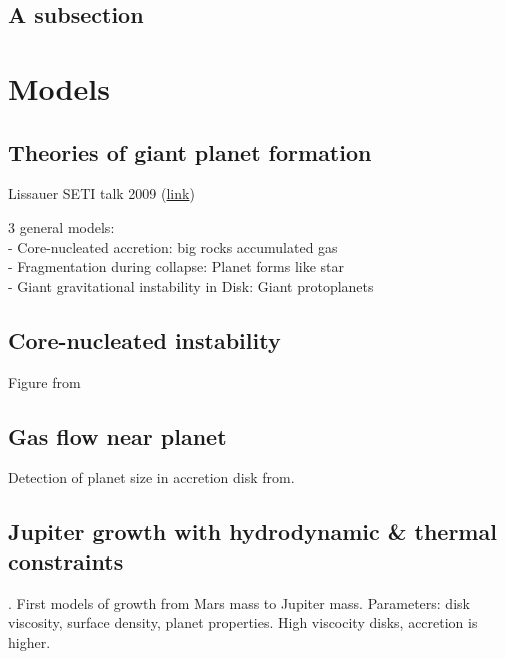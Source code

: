 \documentclass[12pt]{article} %
\begin{document}
\subsection{A subsection}\vspace{-1ex}\titlerule[1pt]\bigskip

\cite{stevenson1982formation}


\section{Models}\vspace{-2ex}\titlerule[1pt]\bigskip

\subsection{Theories of giant planet formation}\vspace{-1ex}\titlerule[1pt]\bigskip

Lissauer SETI talk 2009 (\href{https://www.youtube.com/watch?v=FAa7hb2bT\_g}{link})\newline 

3 general models: \\
- Core-nucleated accretion: big rocks accumulated gas\\
- Fragmentation during collapse: Planet forms like star\\
- Giant gravitational instability in Disk: Giant protoplanets\\

\subsection{Core-nucleated instability}\vspace{-1ex}\titlerule[1pt]\bigskip

Figure from \cite{pollack1996formation}\newline

\subsection{Gas flow near planet}\vspace{-1ex}\titlerule[1pt]\bigskip

Detection of planet size in accretion disk from\cite{bate2003three}.\newline

\subsection{Jupiter growth with hydrodynamic \& thermal constraints}\vspace{-1ex}\titlerule[1pt]\bigskip

\cite{lissauer2009models}. First models of growth from Mars mass to Jupiter mass. Parameters: disk viscosity, surface density, planet properties.\newline
High viscocity disks, accretion is higher.



\newpage

\end{document}
